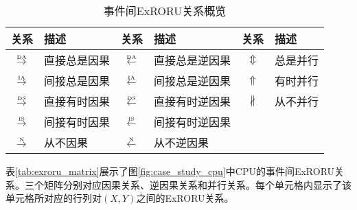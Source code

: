 \begin{table}[htbp]
  \centering
  \begin{minipage}[t]{0.8\textwidth}
  	\caption{事件间ExRORU关系概览}
  	\label{tab:exroru}
  	\begin{tabularx}{\textwidth}{clclcl}
  	  \toprule[1.5pt]
  	  关系 & 描述 & 关系 & 描述 & 关系 & 描述 \\\midrule[1pt]
  	  $\overset{\text{\tiny{DA}}}{\rightarrow}$ & 直接总是因果 & $\overset{\text{\tiny{DA}}}{\leftarrow}$ & 直接总是逆因果 & $\Updownarrow$ & 总是并行\\
  	  $\overset{\text{\tiny{IA}}}{\rightarrow}$ & 间接总是因果 & $\overset{\text{\tiny{IA}}}{\leftarrow}$ & 间接总是逆因果 & $\Uparrow$ & 有时并行\\
  	  $\overset{\text{\tiny{DS}}}{\rightarrow}$ & 直接有时因果 & $\overset{\text{\tiny{DS}}}{\leftarrow}$ & 直接有时逆因果 & $\nparallel$ & 从不并行\\
  	  $\overset{\text{\tiny{IS}}}{\rightarrow}$ & 间接有时因果 & $\overset{\text{\tiny{IS}}}{\leftarrow}$ & 间接有时逆因果 & & \\
  	  $\overset{\text{\tiny{N}}}{\rightarrow}$ & 从不因果 & $\overset{\text{\tiny{N}}}{\leftarrow}$ & 从不逆因果 & & \\
  	  \bottomrule[1.5pt]
  	\end{tabularx}
  \end{minipage}
\end{table}

\begin{example}\label{ex:exroru_matrix}
表\ref{tab:exroru_matrix}展示了图\ref{fig:case_study_cpu}中CPU的事件间ExRORU关系。三个矩阵分别对应因果关系、逆因果关系和并行关系。每个单元格内显示了该单元格所对应的行列对$(X,Y)$之间的ExRORU关系。
\end{example}

